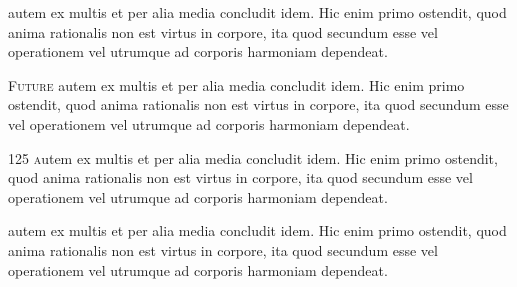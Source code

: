 
\blStartBook



\lettrine{}{}
autem ex multis et per alia media concludit idem. Hic enim primo ostendit, quod anima rationalis 
non est virtus in corpore, ita quod secundum esse vel
operationem vel utrumque ad corporis harmoniam dependeat.

\lettrine{}{Future}
autem ex multis et per alia media concludit idem. Hic enim primo ostendit, quod anima rationalis 
non est virtus in corpore, ita quod secundum esse vel
operationem vel utrumque ad corporis harmoniam dependeat.

\lettrine{125 }
autem ex multis et per alia media concludit idem. Hic enim primo ostendit, quod anima rationalis 
non est virtus in corpore, ita quod secundum esse vel
operationem vel utrumque ad corporis harmoniam dependeat.


\lettrine{}{}
autem ex multis et per alia media concludit idem. Hic enim primo ostendit, quod anima rationalis 
non est virtus in corpore, ita quod secundum esse vel
operationem vel utrumque ad corporis harmoniam dependeat.


\blEndBook

